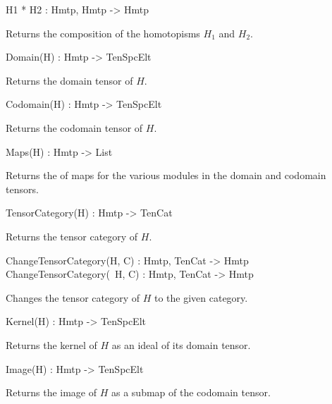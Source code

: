 \begin{intrinsics}
H1 * H2 : Hmtp, Hmtp -> Hmtp
\end{intrinsics}

Returns the composition of the homotopisms $H_1$ and $H_2$.

\begin{intrinsics}
Domain(H) : Hmtp -> TenSpcElt
\end{intrinsics}

Returns the domain tensor of $H$.

\begin{intrinsics}
Codomain(H) : Hmtp -> TenSpcElt
\end{intrinsics}

Returns the codomain tensor of $H$.

\begin{intrinsics}
Maps(H) : Hmtp -> List
\end{intrinsics}

Returns the of maps for the various modules in the domain and codomain 
tensors.

\begin{intrinsics}
TensorCategory(H) : Hmtp -> TenCat
\end{intrinsics}

Returns the tensor category of $H$.

\begin{intrinsics}
ChangeTensorCategory(H, C) : Hmtp, TenCat -> Hmtp
ChangeTensorCategory(~H, C) : Hmtp, TenCat -> Hmtp
\end{intrinsics}

Changes the tensor category of $H$ to the given category.

\begin{intrinsics}
Kernel(H) : Hmtp -> TenSpcElt
\end{intrinsics}

Returns the kernel of $H$ as an ideal of its domain tensor.

\begin{intrinsics}
Image(H) : Hmtp -> TenSpcElt
\end{intrinsics}

Returns the image of $H$ as a submap of the codomain tensor.

